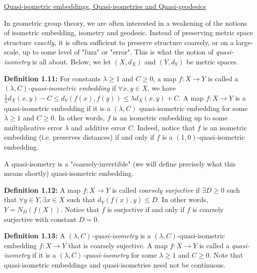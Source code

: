 \documentclass[12pt]{article}
\newcommand{\vs}{\vskip10pt}
\begin{document}
	\vs 
	
	\underline{Quasi-isometric embeddings, Quasi-isometries and Quasi-geodesics}
	
	\vs 
	
	In geometric group theory, we are often interested in a weakening of the notions of isometric embedding, isometry and geodesic. Instead of preserving metric space structure \textit{exactly}, it is often sufficient to preserve structure coarsely, or on a large-scale, up to some level of "fuzz" or "error". This is what the notion of \textit{quasi-isometry} is all about. Below, we let $(X,d_X)$ and $(Y, d_Y)$ be metric spaces.
	
	\vs 
	
	\textbf{Definition 1.11: } For constants $\lambda \geq 1$ and $C \geq 0$, a map $f: X \rightarrow Y$ is called a $(\lambda, C)$-\textit{quasi-isometric embedding} if $\forall x,y \in X$, we have $\frac{1}{\lambda} d_X(x,y) - C \leq d_Y(f(x), f(y)) \leq \lambda d_X(x,y) + C$. A map $f: X \rightarrow Y$ is a quasi-isometric embedding if it is a $(\lambda, C)$ quasi-isometric embedding for some $\lambda \geq 1$ and $C \geq 0$. In other words, $f$ is an isometric embedding up to some multiplicative error $\lambda$ and additive error $C$. Indeed, notice that $f$ is an isometric embedding (i.e. preserves distances) if and only if $f$ is a $(1, 0)$-quasi-isometric embedding. 
	
	\vs 
	
	A quasi-isometry is a "coarsely-invertible" (we will define precisely what this means shortly) quasi-isometric embedding. 
	
	\vs 
	
	\textbf{Definition 1.12: } A map $f: X \rightarrow Y$ is called \textit{coarsely surjective} if $\exists D \geq 0$ such that $\forall y \in Y, \exists x \in X$ such that $d_Y(f(x), y) \leq D$. In other words, $Y = N_D(f(X))$. Notice that $f$ is surjective if and only if $f$ is coarsely surjective with constant $D = 0$. 
	
	\vs 
	
	\textbf{Definition 1.13: } A $(\lambda, C)$\textit{-quasi-isometry} is a $(\lambda, C)$-quasi-isometric embedding $f: X \rightarrow Y$ that is coarsely sujective. A map $f: X \rightarrow Y$ is called a \textit{quasi-isometry} if it is a $(\lambda, C)$\textit{-quasi-isometry} for some $\lambda \geq 1$ and $C \geq 0$. Note that quasi-isometric embeddings and quasi-isometries need not be continuous. 
	
	\vs 
	
\end{document}
